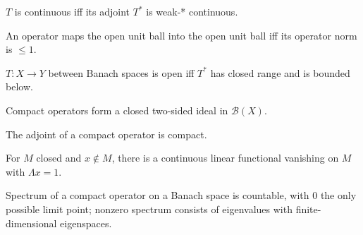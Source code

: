 \begin{theorem}
  \label{thm:adjoint-cont-iff}
  \leanok
  $T$ is continuous iff its adjoint $T^*$ is weak-* continuous.
\end{theorem}

\begin{theorem}
  \label{thm:operatorNorm-le-one}
  \leanok
  An operator maps the open unit ball into the open unit ball iff its
  operator norm is $\le 1$.
\end{theorem}

\begin{theorem}
  \label{thm:open-via-adjoint}
  \leanok
  $T : X \to Y$ between Banach spaces is open iff $T^*$ has closed
  range and is bounded below.
\end{theorem}

\begin{theorem}
  \label{thm:compactOps-ideal}
  \leanok
  Compact operators form a closed two-sided ideal in $\mathcal B(X)$.
\end{theorem}

\begin{theorem}
  \label{thm:adjoint-compact}
  \leanok
  The adjoint of a compact operator is compact.
\end{theorem}

\begin{theorem}
  \label{thm:functional-vanishing}
  \leanok
  For $M$ closed and $x \notin M$, there is a continuous linear
  functional vanishing on $M$ with $\Lambda x = 1$.
\end{theorem}

\begin{theorem}
  \label{thm:spectrum-compactOp}
  \leanok
  Spectrum of a compact operator on a Banach space is countable, with
  $0$ the only possible limit point; nonzero spectrum consists of
  eigenvalues with finite-dimensional eigenspaces.
\end{theorem}

